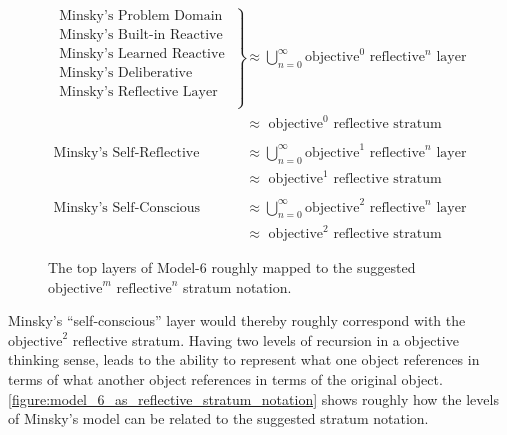 \begin{figure}[bth]
  \begin{align*}
    \left.
    \begin{array}{l}
      \text{Minsky's Problem Domain }\\
      \text{Minsky's Built-in Reactive Layer }\\
      \text{Minsky's Learned Reactive Layer }\\
      \text{Minsky's Deliberative Layer }\\
      \text{Minsky's Reflective Layer }\\
    \end{array}
    \right\}                               &{\approx} \bigcup_{n=0}^{\infty}{\text{objective}^0\text{ reflective}^n\text{ layer}} \\
                                           &{\approx} \text{ objective}^0\text{ reflective stratum} \\
  \end{align*}
  \begin{align*}
    \text{Minsky's Self-Reflective Layer } &{\approx} \bigcup_{n=0}^{\infty}{\text{objective}^1\text{ reflective}^n\text{ layer}} \\
                                           &{\approx} \text{ objective}^1\text{ reflective stratum} \\
  \end{align*}
  \begin{align*}
    \text{Minsky's Self-Conscious Layer }  &{\approx} \bigcup_{n=0}^{\infty}{\text{objective}^2\text{ reflective}^n\text{ layer}} \\
                                           &{\approx} \text{ objective}^2\text{ reflective stratum}
  \end{align*}
\caption{The top layers of Model-6 roughly mapped to the suggested
  $\text{objective}^m\text{ reflective}^n$ stratum notation.}
\label{figure:model_6_as_reflective_stratum_notation}
\end{figure}

Minsky's ``self-conscious'' layer would thereby roughly correspond
with the $\text{objective}^2$ reflective stratum.  Having two levels
of recursion in a objective thinking sense, leads to the ability to
represent what one object references in terms of what another object
references in terms of the original object.
\autoref{figure:model_6_as_reflective_stratum_notation} shows roughly
how the levels of Minsky's model can be related to the suggested
stratum notation.

